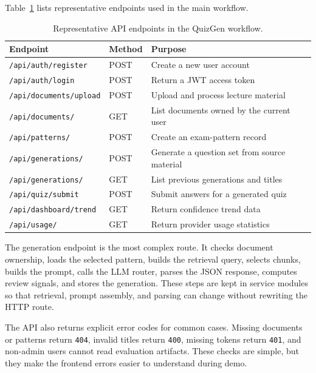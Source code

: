 \documentclass[12pt,a4paper]{article}
\begin{document}
Table~\ref{tab:api-workflow} lists representative endpoints used in the
main workflow.

\begin{table}[H]
  \centering
  \singlespacing
  \caption{Representative API endpoints in the QuizGen workflow.}
  \label{tab:api-workflow}
  \small
  \begin{tabular}{@{}p{4.4cm}p{1.6cm}p{7.4cm}@{}}
    \toprule
    \textbf{Endpoint} & \textbf{Method} & \textbf{Purpose} \\
    \midrule
    \texttt{/api/auth/register} & POST & Create a new user account \\
    \texttt{/api/auth/login} & POST & Return a JWT access token \\
    \texttt{/api/documents/upload} & POST & Upload and process lecture material \\
    \texttt{/api/documents/} & GET & List documents owned by the current user \\
    \texttt{/api/patterns/} & POST & Create an exam-pattern record \\
    \texttt{/api/generations/} & POST & Generate a question set from source material \\
    \texttt{/api/generations/} & GET & List previous generations and titles \\
    \texttt{/api/quiz/submit} & POST & Submit answers for a generated quiz \\
    \texttt{/api/dashboard/trend} & GET & Return confidence trend data \\
    \texttt{/api/usage/} & GET & Return provider usage statistics \\
    \bottomrule
  \end{tabular}
\end{table}

The generation endpoint is the most complex route. It checks document
ownership, loads the selected pattern, builds the retrieval query, selects
chunks, builds the prompt, calls the LLM router, parses the JSON response,
computes review signals, and stores the generation. These steps are kept in
service modules so that retrieval, prompt assembly, and parsing can change
without rewriting the HTTP route.

The API also returns explicit error codes for common cases. Missing
documents or patterns return \texttt{404}, invalid titles return
\texttt{400}, missing tokens return \texttt{401}, and non-admin users cannot
read evaluation artifacts. These checks are simple, but they make the
frontend errors easier to understand during demo.
\end{document}
